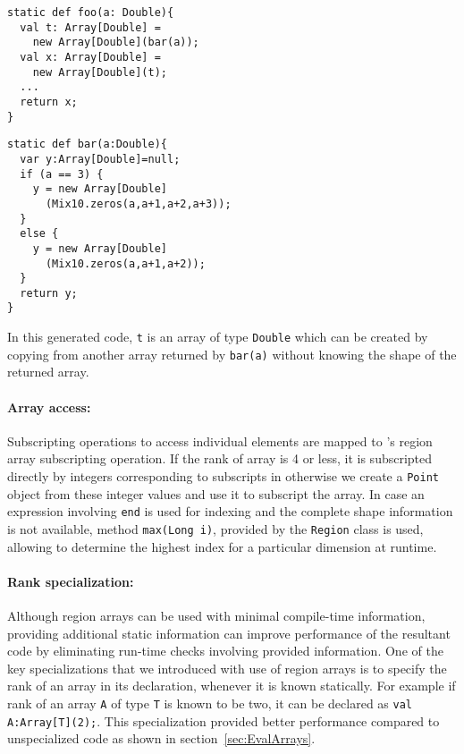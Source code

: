 \begin{minipage}{0.4\linewidth}
\begin{lstlisting}[language=X10,numbers=none]                                   
static def foo(a: Double){
  val t: Array[Double] = 
    new Array[Double](bar(a));
  val x: Array[Double] = 
    new Array[Double](t);
  ...
  return x;
}                         
\end{lstlisting}              
\end{minipage}
\hfill
\hspace{.3cm}
\hfill
\begin{minipage}{0.5\linewidth}
\begin{lstlisting}[language=X10,numbers=none]                                   
static def bar(a:Double){
  var y:Array[Double]=null;
  if (a == 3) {
    y = new Array[Double]
      (Mix10.zeros(a,a+1,a+2,a+3));
  }
  else {
    y = new Array[Double]
      (Mix10.zeros(a,a+1,a+2));
  }
  return y;
}		                        
\end{lstlisting}              
\end{minipage}

\noindent
In this generated \xten code, \verb|t| is an array of type \verb|Double|
which can be created by copying from another array returned by
\verb|bar(a)| without knowing the shape of the returned array. 

\paragraph{Array access:}
Subscripting operations to access individual elements are mapped to
\xten's region array subscripting operation. If the rank of array is 4
or less, it is subscripted directly by integers corresponding to
subscripts in \matlab otherwise we create a \verb|Point| object from
these integer values and use it to subscript the array. In case an
expression involving \verb|end| is used for indexing and the complete
shape information is not available, method \verb|max(Long i)|, provided
by the \verb|Region| class is used, allowing to determine the highest
index for a particular dimension at runtime.

\paragraph{Rank specialization:} Although region arrays can be used with
minimal compile-time information, providing additional static
information can improve performance of the resultant code by eliminating
run-time checks involving provided information. One of the key
specializations that we introduced with use of region arrays is to
specify the rank of an array in its declaration, whenever it is known
statically. For example if rank of an array \verb|A| of type \verb|T| is
known to be two, it can be declared as \verb|val A:Array[T](2);|.  This
specialization provided better performance compared to
unspecialized code as shown in section~\ref{sec:EvalArrays}.



